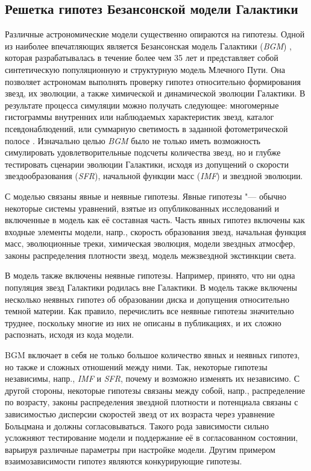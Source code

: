 \subsection{Решетка гипотез Безансонской модели Галактики}
Различные астрономические модели существенно опираются на гипотезы. Одной из наиболее впечатляющих является 
Безансонская модель Галактики (\textit{BGM}) \cite{czekaj2014besanccon, robin2003synthetic}, которая разрабатывалась 
в течение более чем 35 лет и представляет собой синтетическую популяционную и структурную модель Млечного Пути. 
Она позволяет астрономам выполнять проверку гипотез относительно формирования звезд, их эволюции, а также химической 
и динамической эволюции Галактики. В результате процесса симуляции можно получать следующее: многомерные гистограммы 
внутренних или наблюдаемых характеристик звезд, каталог псевдонаблюдений, или суммарную светимость в заданной 
фотометрической полосе \cite{czekaj2012galaxy}. Изначально целью \textit{BGM} было не только иметь возможность 
симулировать удовлетворительные подсчеты количества звезд, но и глубже тестировать сценарии эволюции Галактики, 
исходя из допущений о скорости звездообразования (\textit{SFR}), начальной функции масс 
(\textit{IMF}) и звездной эволюции.

С моделью связаны явные и неявные гипотезы. Явные гипотезы "--- обычно некоторые системы уравнений, взятые из 
опубликованных исследований и включенные в модель как её составная часть. Часть явных гипотез включены как входные 
элементы модели, напр., скорость образования звезд, начальная функция масс, эволюционные треки, химическая эволюция, 
модели звездных атмосфер, законы распределения плотности звезд, модель межзвездной экстинкции света.

В модель также включены неявные гипотезы. Например, принято, что ни одна популяция звезд Галактики родилась вне 
Галактики. В модель также включены несколько неявных гипотез об образовании диска и допущения относительно темной 
материи. Как правило, перечислить все неявные гипотезы значительно труднее, поскольку многие из них не описаны в 
публикациях, и их сложно распознать, исходя из кода модели.

BGM включает в себя не только большое количество явных и неявных гипотез, но также и сложных отношений между ними. 
Так, некоторые гипотезы независимы, напр., \textit{IMF} и \textit{SFR}, почему и возможно изменять их независимо. 
С другой стороны, некоторые гипотезы связаны между собой, напр., распределение по возрасту, законы распределения 
звездной плотности и потенциала связаны с зависимостью дисперсии скоростей звезд от их возраста через уравнение 
Больцмана и должны согласовываться. Такого рода зависимости сильно усложняют тестирование модели и поддержание 
её в согласованном состоянии, варьируя различные параметры при настройке модели. Другим примером взаимозависимости 
гипотез являются конкурирующие гипотезы.

